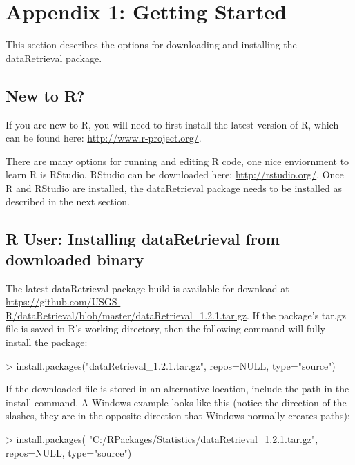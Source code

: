 \documentclass[a4paper,11pt]{article}
\begin{document}
\newpage
\section{Appendix 1: Getting Started}
This section describes the options for downloading and installing the dataRetrieval package.

\subsection{New to R?}
If you are new to R, you will need to first install the latest version of R, which can be found here: \url{http://www.r-project.org/}.

There are many options for running and editing R code, one nice enviornment to learn R is RStudio. RStudio can be downloaded here: \url{http://rstudio.org/}. Once R and RStudio are installed, the dataRetrieval package needs to be installed as described in the next section.

\subsection{R User: Installing dataRetrieval from downloaded binary}
The latest dataRetrieval package build is available for download at \url{https://github.com/USGS-R/dataRetrieval/blob/master/dataRetrieval_1.2.1.tar.gz}.  If the package's tar.gz file is saved in R's working directory, then the following command will fully install the package:

\begin{Schunk}
\begin{Sinput}
> install.packages("dataRetrieval_1.2.1.tar.gz", 
                  repos=NULL, type="source")
\end{Sinput}
\end{Schunk}

If the downloaded file is stored in an alternative location, include the path in the install command.  A Windows example looks like this (notice the direction of the slashes, they are in the opposite direction that Windows normally creates paths):

\begin{Schunk}
\begin{Sinput}
> install.packages(
   "C:/RPackages/Statistics/dataRetrieval_1.2.1.tar.gz", 
   repos=NULL, type="source")
\end{Sinput}
\end{Schunk}
\end{document}
